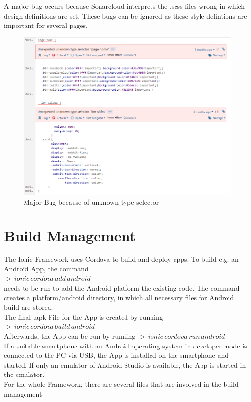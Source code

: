 \documentclass[12pt]{article}
\begin{document}
A major bug occurs because Sonarcloud interprets the .scss-files wrong in which design definitions are set. These bugs can be ignored as these style defintions are important for several pages.
\begin{figure}[H]
  \centering
    \includegraphics[width=1\textwidth]{figures/BugType.png}
    \caption{Major Bug because of unknown type selector}
\end{figure}


\section{Build Management}

The Ionic Framework uses Cordova to build and deploy apps. To build e.g. an Android App, the command\\
$ > \, ionic\, cordova\, add\, android $\\
needs to be run to add the Android platform the existing code. The command creates a platform/android directory, in which all necessary files for Android build are stored.\\
The final .apk-File for the App is created by running\\
$ > \, ionic\, cordova\, build\, android $\\
Afterwards, the App can be run by running
$ > \, ionic\, cordova\, run\, android $\\
If a suitable smartphone with an Android operating system in developer mode is connected to the PC via USB, the App is installed on the smartphone and started. If only an emulator of Android Studio is available, the App is started in the emulator.\\
For the whole Framework, there are several files that are involved in the build management
\end{document}
